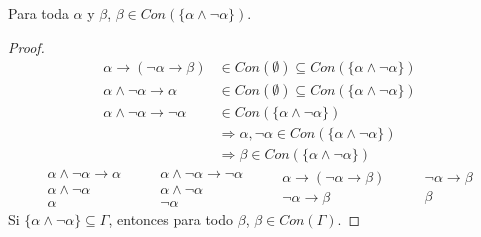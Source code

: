 \begin{prop}
    Para toda $\alpha$ y $\beta$, $\beta\in Con(\{\alpha\land\lnot\alpha\})$.
    \begin{proof}
        \begin{align*}
            \alpha\rightarrow(\lnot\alpha\rightarrow\beta) &\in Con(\emptyset )\subseteq Con(\{\alpha\land\lnot\alpha\})\\
            \alpha\land\lnot\alpha\rightarrow\alpha &\in Con(\emptyset )\subseteq Con(\{\alpha\land\lnot\alpha\}) \\
            \alpha\land \lnot\alpha\rightarrow\lnot\alpha &\in Con(\{\alpha\land\lnot\alpha\})\\
                                                          &\Longrightarrow \alpha,\lnot\alpha\in Con(\{\alpha\land\lnot\alpha\}) \\
                                                          &\Longrightarrow \beta\in Con(\{\alpha\land\lnot\alpha\})
        \end{align*}
        \begin{equation*}
            \begin{array}{c}
                \alpha\land\lnot\alpha\rightarrow\alpha\\
                \alpha\land\lnot\alpha\\
                \hline
                \alpha
            \end{array}\qquad 
            \begin{array}{c}
                \alpha\land\lnot\alpha \rightarrow\lnot\alpha\\
                \alpha\land \lnot\alpha\\
                \hline
                \lnot\alpha
            \end{array}\qquad 
            \begin{array}{c}
                \alpha\rightarrow(\lnot\alpha\rightarrow\beta)\\
                \hline
                \lnot\alpha\rightarrow\beta
            \end{array}\qquad 
            \begin{array}{c}
                \lnot\alpha\rightarrow\beta \\
                \hline
                \beta
            \end{array}
        \end{equation*}
        Si $\{\alpha\land\lnot\alpha\}\subseteq \Gamma$, entonces para todo $\beta$, $\beta\in Con(\Gamma)$.

    \end{proof}
\end{prop}

